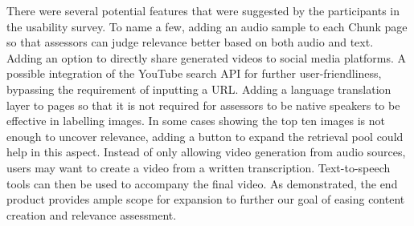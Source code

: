 \documentclass{l4proj}
\begin{document}
There were several potential features that were suggested by the participants in the usability survey. To name a few, adding an audio sample to each Chunk page so that assessors can judge relevance better based on both audio and text. Adding an option to directly share generated videos to social media platforms. A possible integration of the YouTube search API for further user-friendliness, bypassing the requirement of inputting a URL. Adding a language translation layer to pages so that it is not required for assessors to be native speakers to be effective in labelling images. In some cases showing the top ten images is not enough to uncover relevance, adding a button to expand the retrieval pool could help in this aspect. Instead of only allowing video generation from audio sources, users may want to create a video from a written transcription. Text-to-speech tools can then be used to accompany the final video. As demonstrated, the end product provides ample scope for expansion to further our goal of easing content creation and relevance assessment.



\end{document}
